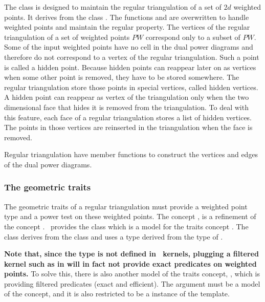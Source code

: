 The class 
 is designed to maintain the
regular triangulation of a set of $2d$ weighted points.
It derives from the class .
The functions  and 
 are overwritten to handle weighted points
and maintain the regular
property.
The vertices of the regular triangulation
of a set of weighted points ${PW}$ correspond  only to a subset
of ${PW}$.
Some of the input
weighted points have no cell in the dual power diagrams
and therefore do not correspond to a vertex of the regular
triangulation.
Such a point is called a hidden point.
Because hidden points can reappear later on as vertices
when  some other point is removed,
they  have to be stored somewhere. 
The regular triangulation  store those points in special vertices, called
hidden vertices. 
A hidden point can reappear as vertex of the triangulation
only when the two dimensional face that hides it
is removed from the triangulation. To deal with this feature,
each face of a regular triangulation stores a list of hidden vertices.
The points in those vertices 
are reinserted in the triangulation  when the face
is removed.

Regular triangulation have member functions to construct
the vertices and edges of the dual power diagrams.

\subsubsection{The geometric traits}
The geometric traits of a regular triangulation
must provide a weighted point type
and a power test on these weighted points.
The concept 
,
is a refinement of the concept
. \cgal\ provides 
the class
which is a model for the traits concept
.
The class 
derives  from the class
and uses a  type
derived from the type  of
.

\textbf{Note that, since the type  is not defined 
in \cgal\ kernels, plugging a filtered kernel  such as 
 in
 will in fact
not provide exact predicates on  weighted points.}
To solve this, there is also another model of the traits concept,
, which is providing filtered
predicates (exact and efficient). The argument  must be a
model of the  concept, and it is also restricted to be a
instance of the  template. 




